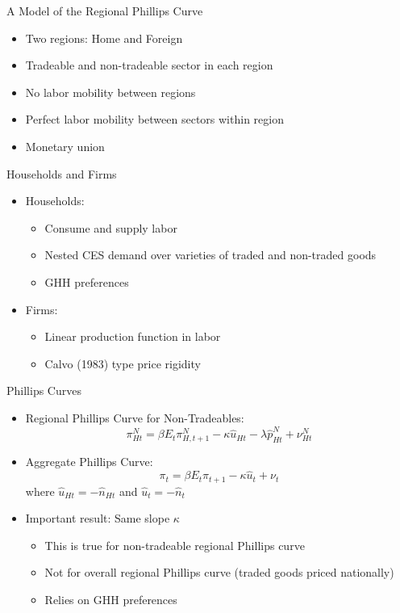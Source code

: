 \documentclass[11pt,aspectratio=169,xcolor={dvipsnames},hyperref={pdftex,pdfpagemode=UseNone,hidelinks,pdfdisplaydoctitle=true},usepdftitle=false]{beamer}
\begin{document}
\begin{frame}{A Model of the Regional Phillips Curve}
	\begin{itemize}
		\itemsep1em 
		\item Two regions: Home and Foreign
		\item Tradeable and non-tradeable sector in each region
		\item No labor mobility between regions
		\item Perfect labor mobility between sectors within region
		\item Monetary union
	\end{itemize}
\end{frame}


\begin{frame}{Households and Firms}
	\begin{itemize}
		\itemsep1em
		\item Households:
		\begin{itemize}
			\item Consume and supply labor
			\item Nested CES demand over varieties of traded and non-traded goods
			\item GHH preferences 
		\end{itemize}
		\item Firms:
		\begin{itemize}
			\item Linear production function in labor 
			\item Calvo (1983) type price rigidity
		\end{itemize}
	\end{itemize}
\end{frame}


\begin{frame}{Phillips Curves}
	\begin{itemize}
		\itemsep1em 
		\item Regional Phillips Curve for Non-Tradeables:
		\[\pi^N_{Ht}=\beta E_{t}\pi^N_{H,t+1}-\kappa\hat{u}_{Ht} - \lambda \hat{p}^N_{Ht} + \nu^N_{Ht} \]
		\item Aggregate Phillips Curve:
		\[\pi_{t}=\beta E_{t} \pi_{t+1} - \kappa\hat{u}_{t} + {\nu}_{t} \]
		where $\hat{u}_{Ht} = - \hat{n}_{Ht}$ and $\hat{u}_t = - \hat{n}_t$ 
		\item Important result: Same slope $\kappa$
		\begin{itemize}
			\item This is true for non-tradeable regional Phillips curve
			\item Not for overall regional Phillips curve (traded goods priced nationally)
			\item Relies on GHH preferences
		\end{itemize}	
	\end{itemize}		
\end{frame}
\end{document}
